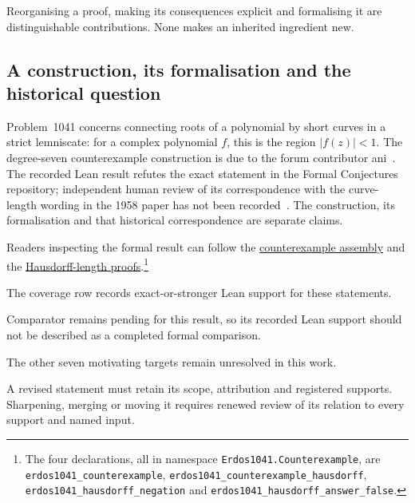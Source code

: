 \documentclass[10pt]{article}
\newcommand{\repobase}{https://github.com/wcook04/plectis-erdos}
\newcommand{\reporef}[2]{\href{\repobase/blob/992cf60a27efd8c34f437e347c413bb781d75c32/#1}{#2}}
\begin{document}
Reorganising a proof, making its consequences explicit and formalising it are distinguishable contributions. None makes an inherited ingredient new.

\subsection{A construction, its formalisation and the historical question}

Problem~1041 concerns connecting roots of a polynomial by short curves in a strict lemniscate: for a complex polynomial $f$, this is the region $|f(z)|<1$. The degree-seven counterexample construction is due to the forum contributor ani~\cite{aniforum,erdos1041}. The recorded Lean result refutes the exact statement in the Formal Conjectures repository; independent human review of its correspondence with the curve-length wording in the 1958 paper has not been recorded~\cite{formalconjectures,fcpr,ehp1958}. The construction, its formalisation and that historical correspondence are separate claims.

Readers inspecting the formal result can follow the \reporef{lean/ErdosProblems/Erdos1041/Counterexample/Assembly.lean}{counterexample assembly} and the \reporef{lean/ErdosProblems/Erdos1041/Counterexample/HausdorffLength.lean}{Hausdorff-length proofs}.\footnote{The four declarations, all in namespace \nolinkurl{Erdos1041.Counterexample}, are \nolinkurl{erdos1041_counterexample}, \nolinkurl{erdos1041_counterexample_hausdorff}, \nolinkurl{erdos1041_hausdorff_negation} and \nolinkurl{erdos1041_hausdorff_answer_false}.}

The coverage row records exact-or-stronger Lean support for these statements.

Comparator remains pending for this result, so its recorded Lean support should not be described as a completed formal comparison.

The other seven motivating targets remain unresolved in this work.

A revised statement must retain its scope, attribution and registered supports. Sharpening, merging or moving it requires renewed review of its relation to every support and named input.
\end{document}
